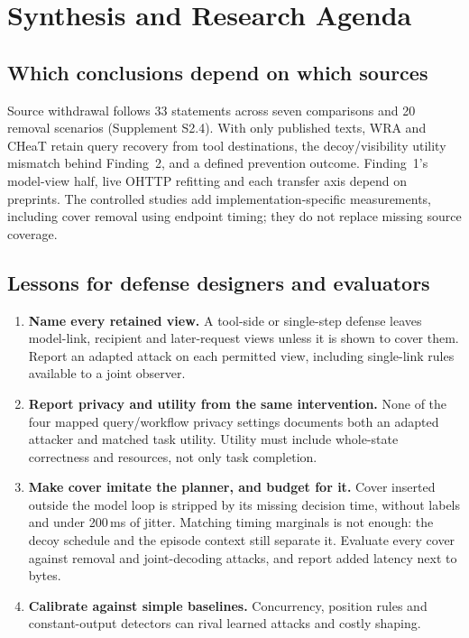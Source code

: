 \section{Synthesis and Research Agenda}\label{sec:agenda}
\subsection{Which conclusions depend on which sources}\label{sec:sensitivity}
Source withdrawal follows 33 statements across seven comparisons and 20 removal scenarios (Supplement S2.4). With only published texts, WRA and CHeaT retain query recovery from tool destinations, the decoy/visibility utility mismatch behind Finding~2, and a defined prevention outcome. Finding~1's model-view half, live OHTTP refitting and each transfer axis depend on preprints. The controlled studies add implementation-specific measurements, including cover removal using endpoint timing; they do not replace missing source coverage.

\subsection{Lessons for defense designers and evaluators}
\begin{enumerate}
\item \textbf{Name every retained view.} A tool-side or single-step defense leaves model-link, recipient and later-request views unless it is shown to cover them. Report an adapted attack on each permitted view, including single-link rules available to a joint observer.
\item \textbf{Report privacy and utility from the same intervention.} None of the four mapped query/workflow privacy settings documents both an adapted attacker and matched task utility. Utility must include whole-state correctness and resources, not only task completion.
\item \textbf{Make cover imitate the planner, and budget for it.} Cover inserted outside the model loop is stripped by its missing decision time, without labels and under 200\,ms of jitter. Matching timing marginals is not enough: the decoy schedule and the episode context still separate it. Evaluate every cover against removal and joint-decoding attacks, and report added latency next to bytes.
\item \textbf{Calibrate against simple baselines.} Concurrency, position rules and constant-output detectors can rival learned attacks and costly shaping.
\end{enumerate}

